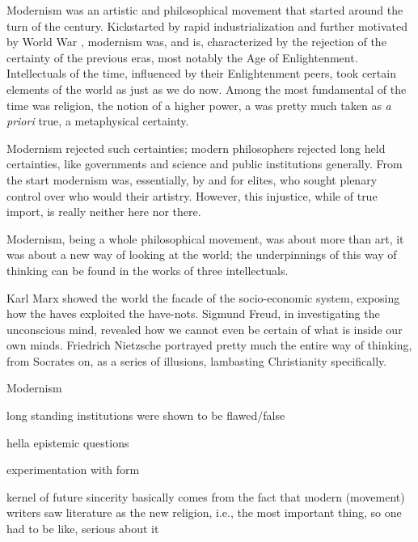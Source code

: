\documentclass[../butidigress.tex]{subfiles}
\newcounter{worldwarcounter}\setcounter{worldwarcounter}{1}
\begin{document}
Modernism was an artistic and philosophical movement that started around the turn of the  century.
Kickstarted by rapid industrialization and further motivated by World War , modernism was, and is, characterized by the rejection of the certainty of the previous eras, most notably the Age of Enlightenment.
Intellectuals of the time, influenced by their Enlightenment peers, took certain elements of the world as  just as we do now.
Among the most fundamental of the time was religion, the notion of a higher power, a  was pretty much taken as \textit{a priori} true, a metaphysical certainty.

Modernism rejected such certainties; modern philosophers rejected long held certainties, like governments and science and public institutions generally.
From the start modernism was, essentially, by and for elites\autocite[2]{cambridgemodern}, who sought plenary control over who would  their artistry.
However, this injustice, while of true import, is really neither here nor there.

Modernism, being a whole philosophical movement, was about more than art, it was about a new way of looking at the world; the underpinnings of this way of thinking can be found in the works of three intellectuals\autocite[9]{cambridgemodern}.

Karl Marx showed the world the facade of the socio-economic system, exposing how the haves exploited the have-nots.
Sigmund Freud, in investigating the unconscious mind, revealed how we cannot even be certain of what is inside our own minds.
Friedrich Nietzsche portrayed pretty much the entire  way of thinking, from Socrates on, as a series of illusions, lambasting Christianity specifically.


\begin{somenotes}{Modernism}
    \item long standing institutions were shown to be flawed/false
    \item hella epistemic questions
    \item experimentation with form
    \item kernel of future sincerity basically comes from the fact that modern (movement) writers saw literature as the new religion, i.e., the most important thing, so one had to be like, serious about it
\end{somenotes}
\end{document}
